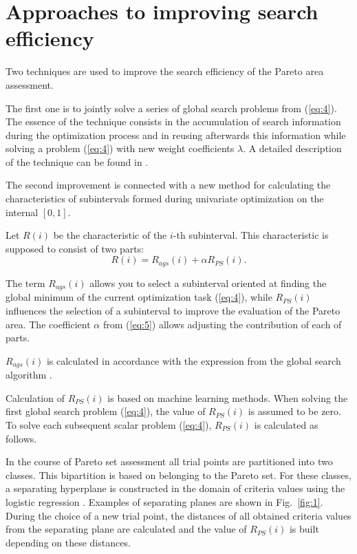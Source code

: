 \documentclass[runningheads]{llncs}
\begin{document}
\section{Approaches to improving search efficiency}

Two techniques are used to improve the search efficiency of the Pareto area assessment. 

The first one is to jointly solve a series of global search problems from (\ref{eq:4}). The essence of the technique consists in the accumulation of search information during the optimization process and in reusing afterwards this information while solving a problem (\ref{eq:4}) with new weight coefficients $\lambda$. A detailed description of the technique can be found in \cite{GergelKozinovAPI2016,Gergel2018}.

The second improvement is connected with a new method for calculating the characteristics of subintervals formed during univariate optimization on the internal $[0,1]$.

Let $R(i)$ be the characteristic of the $i$-th subinterval. This characteristic is supposed to consist of two parts:
\begin{equation}
R(i)=R_{ags} (i)+ \alpha R_{PS} (i).
\label{eq:5}
\end{equation}

The term $R_{ags}(i)$ allows you to select a subinterval oriented at finding the global minimum of the current optimization task (\ref{eq:4}), while $R_{PS}(i)$ influences the selection of a subinterval to improve the evaluation of the Pareto area. The coefficient $\alpha$ from (\ref{eq:5}) allows adjusting the contribution of each of parts.

$R_{ags}(i)$ is calculated in accordance with the expression from the global search algorithm \cite{GergelKozinovAPI2016,Gergel2018,Sergeyev2013,Strongin2000}.

Calculation of $R_{PS}(i)$ is based on machine learning methods. When solving the first global search problem (\ref{eq:4}), the value of $R_{PS}(i)$ is assumed to be zero. To solve each subsequent scalar problem (\ref{eq:4}), $R_{PS}(i)$ is calculated as follows.

In the course of Pareto set assessment all trial points are partitioned into two classes. This bipartition is based on belonging to the Pareto set. For these classes, a separating hyperplane is constructed in the domain of criteria values using the logistic regression \cite{Yu2011}. Examples of separating planes are shown in Fig.~\ref{fig:1}. During the choice of a new trial point, the distances of all obtained criteria values from the separating plane are calculated and the value of $R_{PS}(i)$ is built depending on these distances. 
\end{document}
